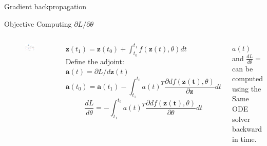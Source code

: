 \documentclass[handout]{beamer}
\begin{document}
\begin{frame}{Gradient backpropagation}
\begin{block}{Objective}
Computing $\partial L/ \partial \theta$
\end{block}
 \begin{columns}
   
        \begin{figure}
        \centering
        \includegraphics[width=\textwidth]{fig/L3/ODEscheme.png}
    \end{figure}
    $\mathbf{z}(t_1) = \mathbf{z}(t_0)  + \int_{t_0}^{t_1} f(\mathbf{z}(t),\theta) dt$\\
    Define the adjoint:\\
    $\mathbf{a}(t)=\partial L / d\mathbf{z}(t)$\\
    $$\mathbf{a}(t_0)=\mathbf{a}(t_1) -\int_{t_1}^{t_0} a(t)^T \frac{\partial d f(\mathbf{z(t)},\theta)}{\partial \mathbf{z}}dt$$
      $$\frac{d L}{d\theta}=-\int_{t_1}^{t_0} a(t)^T \frac{\partial d f(\mathbf{z(t)},\theta)}{\partial \theta}dt$$
    
    $a(t)$ and $\frac{d L}{d\theta}=$ can be computed using the Same ODE solver backward in time.
    \end{columns}
\end{frame}
\end{document}
